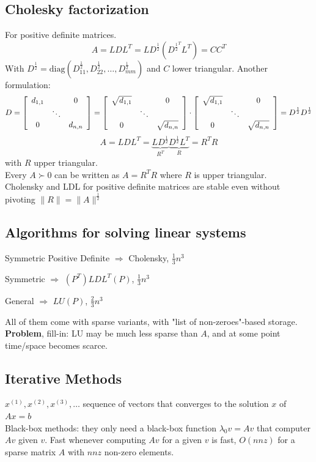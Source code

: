 \documentclass[10pt]{report}
\begin{document}
\subsection{Cholesky factorization}
For positive definite matrices.
$$A=LDL^T=LD^{\frac{1}{2}}(D^{\frac{1}{2}^T}L^T)=CC^T$$
With $D^{\frac{1}{2}}=\text{diag}(D^{\frac{1}{2}}_{11}, D^{\frac{1}{2}}_{22},\ldots,D^{\frac{1}{2}}_{mm})$ and $C$ lower triangular. Another formulation:
$$D = \left[\begin{array}{c c c}
d_{1,1}& & 0\\
& \ddots & \\
0 & & d_{n,n}
\end{array}\right] = \left[\begin{array}{c c c}
\sqrt{d_{1,1}}& & 0\\
& \ddots & \\
0 & & \sqrt{d_{n,n}}
\end{array}\right]\cdot\left[\begin{array}{c c c}
\sqrt{d_{1,1}}& & 0\\
& \ddots & \\
0 & & \sqrt{d_{n,n}}
\end{array}\right] = D^{\frac{1}{2}}D^{\frac{1}{2}}$$
$$A = LDL^T = \underset{R^T}{\underbrace{LD^{\frac{1}{2}}}}\underset{R}{\underbrace{D^{\frac{1}{2}}L^T}} = R^T R$$ with $R$ upper triangular.\\
Every $A \succ 0$ can be written as $A = R^T R$ where $R$ is upper triangular.\\
Cholensky and LDL for positive definite matrices are stable even without pivoting $\|R\|=\|A\|^{\frac{1}{2}}$
\subsection{Algorithms for solving linear systems}
\begin{list}{}{}
	\item Symmetric Positive Definite $\Rightarrow$ Cholensky, $\frac{1}{3}n^3$
	\item Symmetric $\Rightarrow$ $(P^T)LDL^T(P)$, $\frac{1}{3}n^3$
	\item General $\Rightarrow$ $LU(P)$, $\frac{2}{3}n^3$
\end{list}
All of them come with sparse variants, with "list of non-zeroes"-based storage.\\
\textbf{Problem}, fill-in: LU may be much less sparse than $A$, and at some point time/space becomes scarce.
\subsection{Iterative Methods} $x^{(1)}, x^{(2)}, x^{(3)},\ldots$ sequence of vectors that converges to the solution $x$ of $Ax = b$\\
Black-box methods: they only need a black-box function $\lambda_0v=Av$ that computer $Av$ given $v$. Fast whenever computing $Av$ for a given $v$ is fast, $O(nnz)$ for a sparse matrix $A$ with $nnz$ non-zero elements.
\end{document}
